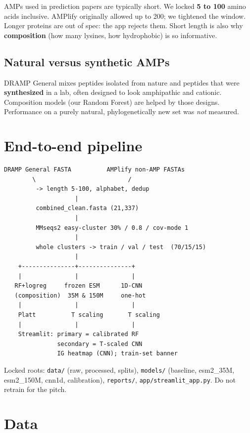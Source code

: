 \documentclass[11pt,a4paper]{report}
\begin{document}
AMPs used in prediction papers are typically short. We locked \textbf{5 to 100} amino acids inclusive. AMPlify originally allowed up to 200; we tightened the window. Longer proteins are out of spec: the app rejects them. Short length is also why \textbf{composition} (how many lysines, how hydrophobic) is so informative.

\section{Natural versus synthetic AMPs}

DRAMP General mixes peptides isolated from nature and peptides that were \textbf{synthesized} in a lab, often designed to look amphipathic and cationic. Composition models (our Random Forest) are helped by those designs. Performance on a purely natural, phylogenetically new set was \emph{not} measured.

\chapter{End-to-end pipeline}
\label{ch:pipe}

\begin{verbatim}
DRAMP General FASTA          AMPlify non-AMP FASTAs
        \                          /
         -> length 5-100, alphabet, dedup
                    |
         combined_clean.fasta (21,337)
                    |
         MMseqs2 easy-cluster 30% / 0.8 / cov-mode 1
                    |
         whole clusters -> train / val / test  (70/15/15)
                    |
    +---------------+---------------+
    |               |               |
   RF+logreg     frozen ESM      1D-CNN
   (composition)  35M & 150M     one-hot
    |               |               |
    Platt          T scaling       T scaling
    |               |               |
    Streamlit: primary = calibrated RF
               secondary = T-scaled CNN
               IG heatmap (CNN); train-set banner
\end{verbatim}

Locked roots: \texttt{data/} (raw, processed, splits), \texttt{models/} (baseline, esm2\_35M, esm2\_150M, cnn1d, calibration), \texttt{reports/}, \texttt{app/streamlit\_app.py}. Do not retrain for the pitch.

\chapter{Data}
\label{ch:data}
\end{document}
